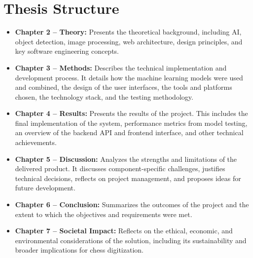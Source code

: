 \vspace{2em}


\section{Thesis Structure}

\begin{itemize}
    
    \item \textbf{Chapter 2 -- Theory:} Presents the theoretical background, including AI, object detection, image processing, web architecture, design principles, and key software engineering concepts.
    
    \item \textbf{Chapter 3 -- Methods:} Describes the technical implementation and development process. It details how the machine learning models were used and combined, the design of the user interfaces, the tools and platforms chosen, the technology stack, and the testing methodology.
    
    \item \textbf{Chapter 4 -- Results:} Presents the results of the project. This includes the final implementation of the system, performance metrics from model testing, an overview of the backend API and frontend interface, and other technical achievements.
    
    \item \textbf{Chapter 5 -- Discussion:} Analyzes the strengths and limitations of the delivered product. It discusses component-specific challenges, justifies technical decisions, reflects on project management, and proposes ideas for future development.
    
    \item \textbf{Chapter 6 -- Conclusion:} Summarizes the outcomes of the project and the extent to which the objectives and requirements were met.

    \item \textbf{Chapter 7 -- Societal Impact:} Reflects on the ethical, economic, and environmental considerations of the solution, including its sustainability and broader implications for chess digitization.
    
\end{itemize}